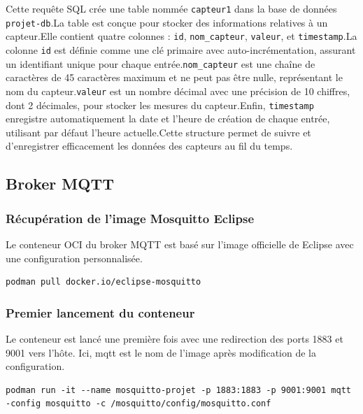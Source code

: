 \documentclass[a4paper,11pt]{article}
\begin{document}
        Cette requête SQL crée une table nommée \texttt{capteur1} dans la base de données \texttt{projet-db}.\newline La table est conçue pour stocker des informations relatives à un capteur.\newline Elle contient quatre colonnes : \texttt{id}, \texttt{nom\_capteur}, \texttt{valeur}, et \texttt{timestamp}.\newline La colonne \texttt{id} est définie comme une clé primaire avec auto-incrémentation, assurant un identifiant unique pour chaque entrée.\newline \texttt{nom\_capteur} est une chaîne de caractères de 45 caractères maximum et ne peut pas être nulle, représentant le nom du capteur.\newline \texttt{valeur} est un nombre décimal avec une précision de 10 chiffres, dont 2 décimales, pour stocker les mesures du capteur.\newline Enfin, \texttt{timestamp} enregistre automatiquement la date et l'heure de création de chaque entrée, utilisant par défaut l'heure actuelle.\newline Cette structure permet de suivre et d'enregistrer efficacement les données des capteurs au fil du temps.

        \newpage
        \subsection{Broker MQTT}
        \subsubsection{Récupération de l'image Mosquitto Eclipse}
        Le conteneur OCI du broker MQTT est basé sur l'image officielle de Eclipse avec une configuration personnalisée.
        \begin{lstlisting}[style=bash, caption={Récupération du conteneur officiel eclipse-mosquitto}]
podman pull docker.io/eclipse-mosquitto
        \end{lstlisting}

        \subsubsection{Premier lancement du conteneur}
        Le conteneur est lancé une première fois avec une redirection des ports 1883 et 9001 vers l'hôte. Ici, mqtt est le nom de l'image après modification de la configuration.
        \begin{lstlisting}[style=bash, caption={Premier lancement du conteneur mqtt avec les bons paramètres}]
podman run -it --name mosquitto-projet -p 1883:1883 -p 9001:9001 mqtt -config mosquitto -c /mosquitto/config/mosquitto.conf
        \end{lstlisting}
\end{document}

